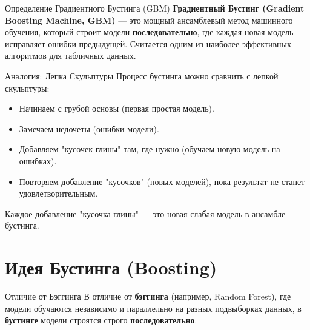 
\begin{myblock}{Определение Градиентного Бустинга (GBM)}
    \textbf{Градиентный Бустинг (Gradient Boosting Machine, GBM)} — это мощный ансамблевый метод машинного обучения, который строит модели \textbf{последовательно}, где каждая новая модель исправляет ошибки предыдущей. Считается одним из наиболее эффективных алгоритмов для табличных данных.
\end{myblock}

\begin{textbox}{Аналогия: Лепка Скульптуры}
    Процесс бустинга можно сравнить с лепкой скульптуры:
    \begin{itemize}[nosep, leftmargin=*]
        \item Начинаем с грубой основы (первая простая модель).
        \item Замечаем недочеты (ошибки модели).
        \item Добавляем "кусочек глины" там, где нужно (обучаем новую модель на ошибках).
        \item Повторяем добавление "кусочков" (новых моделей), пока результат не станет удовлетворительным.
    \end{itemize}
    Каждое добавление "кусочка глины" — это новая слабая модель в ансамбле бустинга.
\end{textbox}

\section{Идея Бустинга (Boosting)}

\begin{myblock}{Отличие от Бэггинга}
    В отличие от \textbf{бэггинга} (например, Random Forest), где модели обучаются независимо и параллельно на разных подвыборках данных, в \textbf{бустинге} модели строятся строго \textbf{последовательно}.
\end{myblock}

